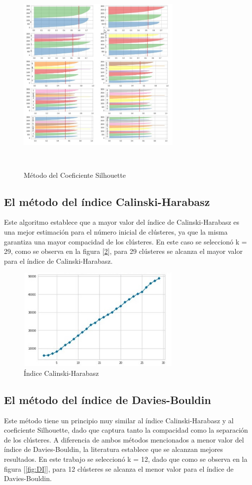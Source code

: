 \begin{figure}[h!]
	\centering
	\includegraphics[width=8cm, height=10cm]{Images/SCoe2.jpg} 
	\caption{Método del Coeficiente Silhouette}
	\label{fig:SCoe2}
\end{figure}
\subsection{El método del índice Calinski-Harabasz}
Este algoritmo establece que a mayor valor del índice de Calinski-Harabasz es una mejor estimación para el número inicial de clústeres, ya que la misma garantiza una mayor compacidad de los clústeres. En este caso se seleccionó k = 29, como se observa en la figura [\ref*{fig:CI}], para 29 clústeres se alcanza el mayor valor para el índice de Calinski-Harabasz.


\begin{figure}[h!]
	\centering
	\includegraphics[width=8cm, height=5cm]{Images/CIndex.jpg} 
	\caption{Índice Calinski-Harabasz}
	\label{fig:CI}
\end{figure}
\subsection{El método del índice de Davies-Bouldin}
Este método tiene un principio muy similar al índice Calinski-Harabasz y al coeficiente Silhouette, dado que captura tanto la compacidad como la separación de los clústeres. A diferencia de ambos métodos mencionados a menor valor del índice de Davies-Bouldin, la literatura establece que se alcanzan mejores resultados. En este trabajo se seleccionó k = 12, dado que como se observa en la figura [\ref{fig:DI}], para 12 clústeres se alcanza el menor valor para el índice de Davies-Bouldin.

